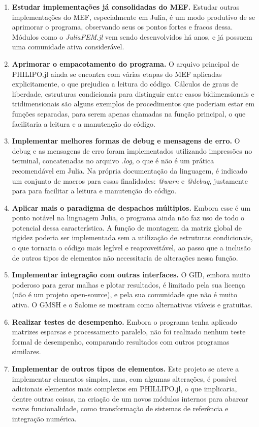 \begin{enumerate}
    \item \textbf{Estudar implementações já consolidadas do MEF.} Estudar outras implementações do MEF, especialmente em Julia, é um modo produtivo de se aprimorar o programa, observando seus os pontos fortes e fracos dessa. Módulos como o \emph{JuliaFEM.jl} vem sendo desenvolvidos há anos, e já possuem uma comunidade ativa considerável.
    \item \textbf{Aprimorar o empacotamento do programa.} O arquivo principal de PHILIPO.jl ainda se encontra com várias etapas do MEF aplicadas explicitamente, o que prejudica a leitura do código. Cálculos de graus de liberdade, estruturas condicionais para distinguir entre casos bidimensionais e tridimensionais são alguns exemplos de procedimentos que poderiam estar em funções separadas, para serem apenas chamadas na função principal, o que facilitaria a leitura e a manutenção do código.
    \item \textbf{Implementar melhores formas de debug e mensagens de erro.} O debug e as mensagens de erro foram implementados utilizando impressões no terminal, concatenadas no arquivo \emph{.log}, o que é não é um prática recomendável em Julia. Na própria documentação da linguagem, é indicado um conjunto de macros para essas finalidades: \emph{@warn} e \emph{@debug}, justamente para para facilitar a leitura e manutenção do código.
    \item \textbf{Aplicar mais o paradigma de despachos múltiplos.} Embora esse é um ponto notável na linguagem Julia, o programa ainda não faz uso de todo o potencial dessa característica. A função de montagem da matriz global de rigidez poderia ser implementada sem a utilização de estruturas condicionais, o que tornaria o código mais legível e reaproveitável, ao passo que a inclusão de outros tipos de elementos não necessitaria de alterações nessa função.
    \item \textbf{Implementar integração com outras interfaces.} O GID, embora muito poderoso para gerar malhas e plotar resultados, é limitado pela sua licença (não é um projeto open-source), e pela sua comunidade que não é muito ativa. O GMSH e o Salome se mostram como alternativas viáveis e gratuitas.
    \item \textbf{Realizar testes de desempenho.} Embora o programa tenha aplicado matrizes esparsas e processamento paralelo, não foi realizado nenhum teste formal de desempenho, comparando resultados com outros programas similares.
    \item \textbf{Implementar de outros tipos de elementos.} Este projeto se ateve a implementar elementos simples, mas, com algumas alterações, é possível adicionais elementos mais complexos em PHILLIPO.jl, o que implicaria, dentre outras coisas, na criação de um novos módulos internos para abarcar novas funcionalidade, como transformação de sistemas de referência e integração numérica.

\end{enumerate}
